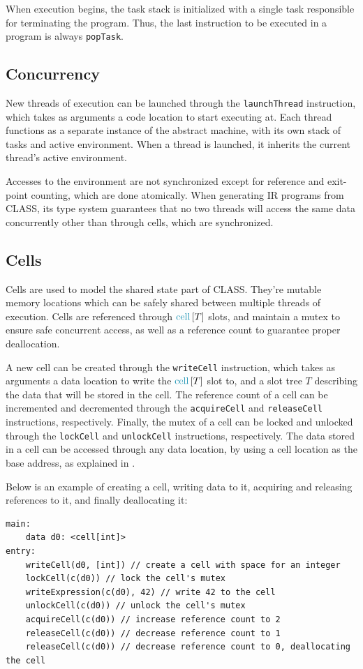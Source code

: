 When execution begins, the task stack is initialized with a single task responsible for terminating the program. Thus, the last instruction to be executed in a program is always \texttt{popTask}.

\subsection{Concurrency} \label{subsection:IRThreads}

New threads of execution can be launched through the \texttt{launchThread} instruction, which takes as arguments a code location to start executing at. Each thread functions as a separate instance of the abstract machine, with its own stack of tasks and active environment. When a thread is launched, it inherits the current thread's active environment.

Accesses to the environment are not synchronized except for reference and exit-point counting, which are done atomically. When generating \ac{IR} programs from \ac{CLASS}, its type system guarantees that no two threads will access the same data concurrently other than through cells, which are synchronized.

\subsection{Cells} \label{subsection:Cells}

Cells are used to model the shared state part of \ac{CLASS}. They're mutable memory locations which can be safely shared between multiple threads of execution. Cells are referenced through $\cells{T}$ slots, and maintain a mutex to ensure safe concurrent access, as well as a reference count to guarantee proper deallocation.

A new cell can be created through the \texttt{writeCell} instruction, which takes as arguments a data location to write the $\cells{T}$ slot to, and a slot tree $T$ describing the data that will be stored in the cell. The reference count of a cell can be incremented and decremented through the \texttt{acquireCell} and \texttt{releaseCell} instructions, respectively. Finally, the mutex of a cell can be locked and unlocked through the \texttt{lockCell} and \texttt{unlockCell} instructions, respectively. The data stored in a cell can be accessed through any data location, by using a cell location as the base address, as explained in .

Below is an example of creating a cell, writing data to it, acquiring and releasing references to it, and finally deallocating it:
\begin{lstlisting}[language=IR, frame=bottom]
main:
    data d0: <cell[int]>
entry:
    writeCell(d0, [int]) // create a cell with space for an integer
    lockCell(c(d0)) // lock the cell's mutex
    writeExpression(c(d0), 42) // write 42 to the cell
    unlockCell(c(d0)) // unlock the cell's mutex
    acquireCell(c(d0)) // increase reference count to 2
    releaseCell(c(d0)) // decrease reference count to 1
    releaseCell(c(d0)) // decrease reference count to 0, deallocating the cell
\end{lstlisting}

